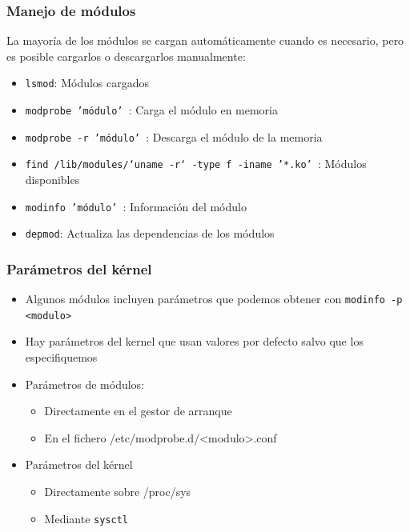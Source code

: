 \documentclass{beamer}
\begin{document}
\begin{frame} \frametitle{Manejo de módulos}
  La mayoría de los módulos se cargan automáticamente cuando es
  necesario, pero es posible cargarlos o descargarlos manualmente:\par
\vspace{1cm}
  \begin{itemize}
  \item \texttt{lsmod}: Módulos cargados
  \item \texttt{modprobe 'módulo' }: Carga el módulo en memoria
  \item \texttt{modprobe -r 'módulo' }: Descarga el módulo de la memoria
  \item \texttt{find /lib/modules/`uname -r` -type f -iname '*.ko' }: Módulos disponibles
  \item \texttt{modinfo 'módulo' }: Información del módulo
  \item \texttt{depmod}: Actualiza las dependencias de los módulos 
  \end{itemize}
\end{frame}

\begin{frame}
  \frametitle{Parámetros del kérnel}
  \begin{itemize}
  \item Algunos módulos incluyen parámetros que podemos obtener con
    \texttt{modinfo -p <modulo>}
  \item Hay parámetros del kernel que usan valores por defecto salvo
    que los especifiquemos
  \item Parámetros de módulos:
    \begin{itemize}
    \item Directamente en el gestor de arranque
    \item En el fichero /etc/modprobe.d/<modulo>.conf
    \end{itemize}
  \item Parámetros del kérnel
    \begin{itemize}
    \item Directamente sobre /proc/sys
    \item Mediante \texttt{sysctl}
    \end{itemize}
  \end{itemize}
\end{frame}
\end{document}
